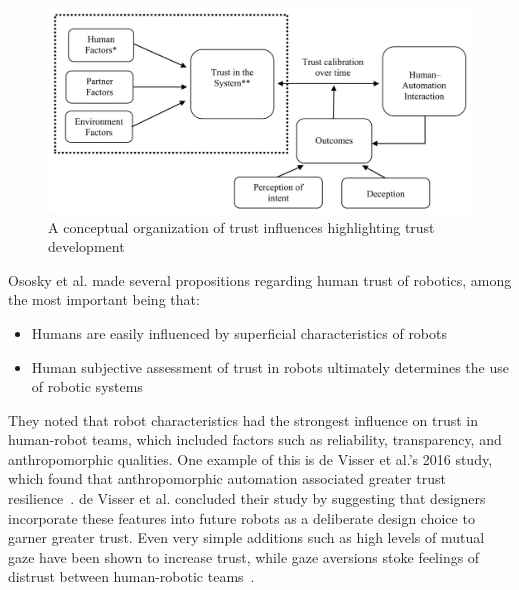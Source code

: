 \begin{figure}[b!]
    \begin{center}
        \includegraphics[width=0.8\linewidth]{figures/TradeStudy/figure4.png}
        \caption{A conceptual organization of trust influences highlighting trust development~\citep{schaefer_meta-analysis_2016}}
        \label{figure-hari:trust}
    \end{center}
\end{figure}

Ososky et al. made several propositions regarding human trust of robotics, among the most important being that:
\begin{itemize}
    \item Humans are easily influenced by superficial characteristics of robots
    \item Human subjective assessment of trust in robots ultimately determines the use of robotic systems~\citep{ososky_building_2013}
\end{itemize}
They noted that robot characteristics had the strongest influence on trust in human-robot teams, which included factors such as reliability, transparency, and anthropomorphic qualities.
One example of this is de Visser et al.'s 2016 study, which found that anthropomorphic automation associated greater trust resilience~\citep{de_visser_almost_2016}.
de Visser et al. concluded their study by suggesting that designers incorporate these features into future robots as a deliberate design choice to garner greater trust.
Even very simple additions such as high levels of mutual gaze have been shown to increase trust, while gaze aversions stoke feelings of distrust between human-robotic teams~\citep{admoni_social_2017}.

